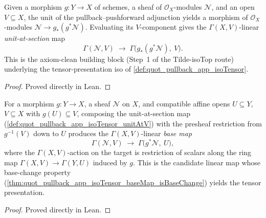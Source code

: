 \begin{definition}

  \label{def:quot_pullback_app_isoTensor_unitAtV}
  Given a morphism \(g : Y \to X\) of schemes, a sheaf of
  \(\mathcal{O}_X\)-modules \(\mathcal{N}\), and an open \(V \subseteq X\),
  the unit of the pullback--pushforward adjunction yields a morphism of
  \(\mathcal{O}_X\)-modules \(\mathcal{N} \to g_*(g^* \mathcal{N})\).
  Evaluating its \(V\)-component gives the \(\Gamma(X, V)\)-linear
  \emph{unit-at-section} map
  \[
    \Gamma(\mathcal{N}, V)
    \;\longrightarrow\;
    \Gamma\bigl(g_*(g^* \mathcal{N}),\ V\bigr).
  \]
  This is the axiom-clean building block (Step~1 of the Tilde-isoTop route)
  underlying the tensor-presentation iso of
  \cref{def:quot_pullback_app_isoTensor}.
\end{definition}
\begin{proof} Proved directly in Lean. \end{proof}

\begin{definition}

  \label{def:quot_pullback_app_isoTensor_baseMap}
  For a morphism \(g : Y \to X\), a sheaf \(\mathcal{N}\) on \(X\), and
  compatible affine opens \(U \subseteq Y\), \(V \subseteq X\) with
  \(g(U) \subseteq V\), composing the unit-at-section map
  (\cref{def:quot_pullback_app_isoTensor_unitAtV}) with the presheaf
  restriction from \(g^{-1}(V)\) down to \(U\) produces the
  \(\Gamma(X, V)\)-linear \emph{base map}
  \[
    \Gamma(\mathcal{N}, V)
    \;\longrightarrow\;
    \Gamma\bigl(g^* \mathcal{N},\ U\bigr),
  \]
  where the \(\Gamma(X, V)\)-action on the target is restriction of scalars
  along the ring map \(\Gamma(X, V) \to \Gamma(Y, U)\) induced by \(g\). This
  is the candidate linear map whose base-change property
  (\cref{thm:quot_pullback_app_isoTensor_baseMap_isBaseChange}) yields the
  tensor presentation.
\end{definition}
\begin{proof} Proved directly in Lean. \end{proof}

